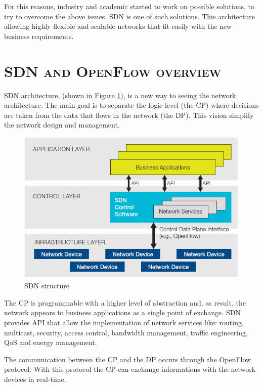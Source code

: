 For this reasons, industry and academic started to work on possible solutions, to try to overcome the above issues. \acf{SDN} is one of such solutions. This architecture allowing highly flexible and scalable networks that fit easily with the new business requirements. 

\section*{\small \textsc{\ac{SDN} and OpenFlow overview}}
\ac{SDN} architecture, (shown in Figure \ref{fig:sdn-and-openflow-overview:sdn-structure}), is a new way to seeing the network architecture. The main goal is to separate the logic level (the \ac{CP}) where decisions are taken from the data that flows in the network (the \ac{DP}). This vision simplify the network design and management.

\begin{figure}
\centering
\includegraphics[scale=0.4]{Introduction/Image/SDNStructure.png}
\caption{\ac{SDN} structure}
\label{fig:sdn-and-openflow-overview:sdn-structure}
\end{figure}

The \ac{CP} is programmable with a higher level of abstraction and, as result, the network appears to business applications as a single point of exchange.
\ac{SDN} provides \ac{API} that allow the implementation of network services like: routing, multicast, security, access control, bandwidth management, traffic engineering, \ac{QoS} and energy management.

The communication between the \ac{CP} and the \ac{DP} occurs through the OpenFlow protocol. \cite{onf:sdn-description-openflow} With this protocol the \ac{CP} can exchange informations with the network devices in real-time.

